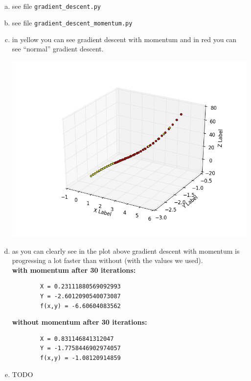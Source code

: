 \documentclass[12pt]{article}
\begin{document}
\subsection{ }
\begin{enumerate}[a)]
    \item 
        see file \verb!gradient_descent.py!

    \item
        see file \verb!gradient_descent_momentum.py!

    \item
        in yellow you can see gradient descent with momentum and in red you can see ``normal'' gradient descent.\\
        \begin{center}
            \includegraphics[scale = 0.8]{pictures/figure_1}\\
        \end{center}

    \item
        as you can clearly see in the plot above gradient descent with momentum is progressing a lot faster than without (with the values we used).\\

        \textbf{with momentum after 30 iterations:}
        \begin{verbatim}
        X = 0.23111880569092993
        Y = -2.6012090540073087
        f(x,y) = -6.60604083562
        \end{verbatim}

        \textbf{without momentum after 30 iterations:}
        \begin{verbatim}
        X = 0.831146841312047
        Y = -1.7758446902974057
        f(x,y) = -1.08120914859
        \end{verbatim}

    \item
        TODO

\end{enumerate}
\end{document}
